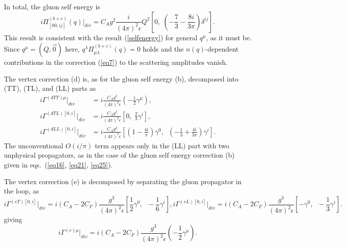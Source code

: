 \documentclass[preprint,amsmath,amssymb,superscriptaddress, floatfix,nofootinbib]{revtex4}
\begin{document}
%
In total, the gluon self energy is 
%
\begin{equation}
i\Pi^{(b+c)}_{[00,ij]}(q)|_{div} =  
C_A g^2 \frac{i}{(4\pi)^2\epsilon} Q^2
\left[ 0, \; 
\left( -\frac{7}{3} - \frac{8i}{3\pi}  \right) \delta^{ij} \right] . 
\label{eq30} 
\end{equation}
%
This result is consistent with the result (\ref{selfenergy}) 
for general $q^{\mu}$, as it must be. 
Since $q^{\mu}=(Q,\vec{0})$ here, $q^{\lambda}\Pi^{(b+c)}_{\mu\lambda}(q)=0$ holds and
the $n(q)$-dependent 
contributions in the correction (\ref{eq7}) to the scattering amplitudes vanish. 

The vertex correction (d) is, as for the gluon self energy (b), decomposed 
into (TT), (TL), and (LL) parts as 
%
\begin{subequations}
\begin{align}
i\Gamma^{(dTT)\mu} |_{div} & =    
i\frac{C_A g^3}{(4\pi)^2\epsilon} 
\left( -\frac{1}{2} \gamma^{\mu} \right) , 
\label{vertexdtt} 
\\
%
i\Gamma^{(dTL)[0,i]}|_{div} & =
i\frac{C_A g^3}{(4\pi)^2\epsilon}  \left[ 0, \; \frac{2}{3}\gamma^i  \right] , 
\\
%
i\Gamma^{(dLL)[0,i]}|_{div} & =
i\frac{C_A g^3}{(4\pi)^2\epsilon}  
\left[ 
\left( 1 -\frac{4i}{\pi} \right) \gamma^0, \;\; 
\left( -\frac{1}{3}+\frac{4i}{3\pi} \right) \gamma^i  \right]  .
\end{align}
\end{subequations}
%
The unconventional $O(i/\pi)$ term appears only in the (LL) part 
with two unphysical propagators, as in the case of the gluon 
self energy correction (b) given in eqs.~(\ref{eq16}, \ref{eq21}, \ref{eq25}). 

The vertex correction (e) is decomposed by separating the gluon propagator 
in the loop, as 
%
\begin{subequations}
\begin{equation}
i\Gamma^{(eT)[0,i]} |_{div} =  
i(C_A-2C_F) \frac{g^3}{(4\pi)^2\epsilon} 
\left[ \frac{1}{2} \gamma^0,\;\; -\frac{1}{6} \gamma^i  \right] ,
\label{vertexet}
\end{equation}    
\begin{equation}
%
i\Gamma^{(eL)[0,i]}|_{div} =  
i(C_A-2C_F) \frac{g^3}{(4\pi)^2\epsilon}  
\left[ -\gamma^0,\;\; -\frac{1}{3} \gamma^i  \right] . 
\label{vertexel}
\end{equation}
\end{subequations}
giving
\begin{equation}
    i\Gamma^{(e)\mu}|_{div}
    =i(C_A-2C_F)
    \frac{g^3}{(4\pi)^2\epsilon}
    \left(
    -\frac{1}{2}\gamma^\mu\right)
    .
    \label{eq:vexeTeL}
\end{equation}
\end{document}
